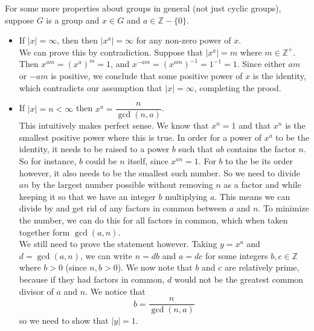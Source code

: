 \documentclass[12pt]{article}
\newcommand{\Z}{\mathbb{Z}}
\begin{document}
    For some more properties about groups in general
    (not just cyclic groups),
    suppose $G$ is a group and $x \in G$ and $a \in \Z - \{0\}$.
    \begin{itemize}[label=$\diamond$]
        \item 
            If $|x| = \infty$, then 
            then $|x^a| = \infty$ for any non-zero power of $x$. \\
            We can prove this by contradiction.
            Suppose that $|x^a| = m$ where $m \in \Z^+$.
            Then $x^{am} = (x^a)^m = 1$,
            and $x^{-am} = (x^{am})^{-1} = 1^{-1} = 1$.
            Since either $am$ or $-am$ is positive,
            we conclude that some positive power of $x$
            is the identity,
            which contradicts our assumption that $|x| = \infty$,
            completing the prood.
        \item
            If $|x| = n < \infty$
            then $x^a = \dfrac{n}{\gcd(n, a)}$. \\
            This intuitively makes perfect sense.
            We know that $x^n = 1$ and that $x^n$
            is the smallest positive power where this is true.
            In order for a power of $x^a$ to be the identity,
            it needs to be raised to a power $b$
            such that $ab$ contains the factor $n$.
            So for instance, $b$ could be $n$ itself,
            since $x^{an} = 1$. 
            For $b$ to the be its order however,
            it also needs to be the smallest such number.
            So we need to divide $an$ by the largest
            number possible without removing $n$ as a factor
            and while keeping it so that we have
            an integer $b$ multiplying $a$.
            This means we can divide by and get rid of 
            any factors in common between $a$ and $n$.
            To minimize the number,
            we can do this for all factors in common,
            which when taken together form $\gcd(a, n)$. \\
            We still need to prove the statement however.
            Taking $y = x^a$ and $d = \gcd(a, n)$,
            we can write $n = db$ and $a = dc$ 
            for some integers $b, c \in \Z$
            where $b > 0$ (since $n, b > 0$).
            We now note that $b$ and $c$ are relatively prime,
            because if they had factors in common,
            $d$ would not be the greatest common divisor of $a$ and $n$.
            We notice that
            \[ b = \dfrac{n}{\gcd(n, a)} \]
            so we need to show that $|y| = 1$.

\end{itemize}
\end{document}
